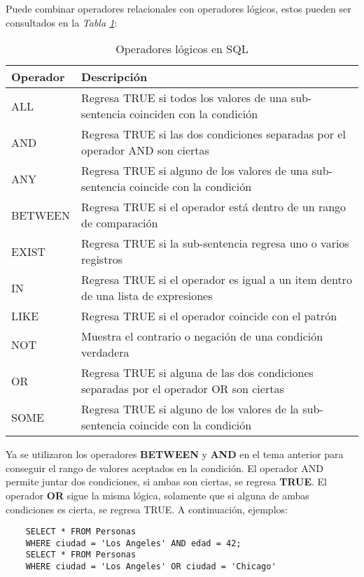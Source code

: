 Puede combinar operadores relacionales con operadores lógicos, estos pueden ser consultados en la \textit{Tabla \ref{tab: 11}}:
\begin{table}[H]
    \centering
    \caption{Operadores lógicos en SQL}
    \label{tab: 11}
    \begin{tabular}{m{3cm} m{10cm}}
        \hline
        \textbf{Operador} & \textbf{Descripción} \\
        \hline
        ALL     & Regresa TRUE si todos los valores de una sub-sentencia coinciden con la condición \\
        AND     & Regresa TRUE si las dos condiciones separadas por el operador AND son ciertas \\
        ANY     & Regresa TRUE si alguno de los valores de una sub-sentencia coincide con la condición \\
        BETWEEN & Regresa TRUE si el operador está dentro de un rango de comparación \\
        EXIST   & Regresa TRUE si la sub-sentencia regresa uno o varios registros \\
        IN      & Regresa TRUE si el operador es igual a un item dentro de una lista de expresiones \\
        LIKE    & Regresa TRUE si el operador coincide con el patrón \\
        NOT     & Muestra el contrario o negación de una condición verdadera \\
        OR      & Regresa TRUE si alguna de las dos condiciones separadas por el operador OR son ciertas \\
        SOME    & Regresa TRUE si alguno de los valores de la sub-sentencia coincide con la condición \\
        \hline
    \end{tabular}
\end{table}

Ya se utilizaron los operadores \textbf{BETWEEN} y \textbf{AND} en el tema anterior para conseguir el rango de valores aceptados en la condición. El operador AND permite juntar dos condiciones, si ambas son ciertas, se regresa \textbf{TRUE}. El operador \textbf{OR} sigue la misma lógica, solamente que si alguna de ambas condiciones es cierta, se regresa TRUE. A continuación, ejemplos:
\begin{lstlisting}
    SELECT * FROM Personas
    WHERE ciudad = 'Los Angeles' AND edad = 42;
    SELECT * FROM Personas
    WHERE ciudad = 'Los Angeles' OR ciudad = 'Chicago'
\end{lstlisting}

